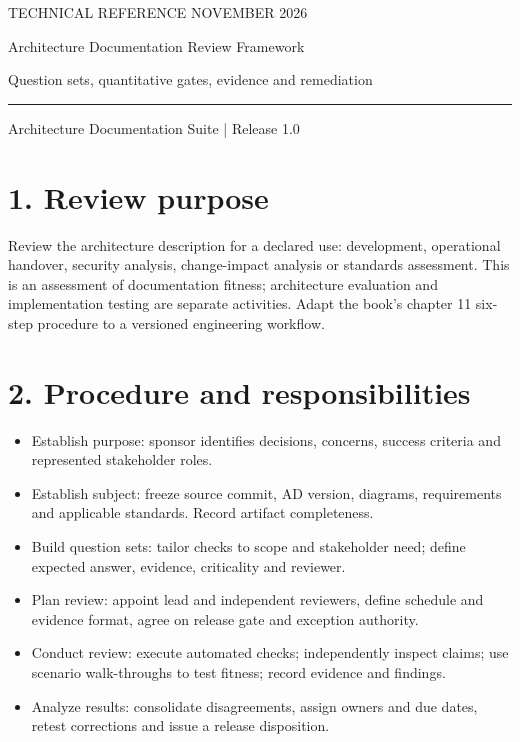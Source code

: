 \documentclass[11pt,letterpaper]{article}
\begin{document}
\thispagestyle{empty}
{\color{accent}\large TECHNICAL REFERENCE \hfill NOVEMBER 2026}\par\vspace{1.1cm}
{\color{ink}\LARGE\bfseries\raggedright Architecture Documentation Review Framework}\par\vspace{0.35cm}
{\Large Question sets, quantitative gates, evidence and remediation}\par\vspace{0.55cm}
\rule{\textwidth}{0.7pt}\par\smallskip
{\small Architecture Documentation Suite | Release 1.0}\par\vspace{0.7cm}
\tableofcontents
\newpage
\section*{1. Review purpose}
Review the architecture description for a declared use: development, operational handover, security analysis, change-impact analysis or standards assessment. This is an assessment of documentation fitness; architecture evaluation and implementation testing are separate activities. Adapt the book's chapter 11 six-step procedure to a versioned engineering workflow.\par\smallskip
\section*{2. Procedure and responsibilities}
\begin{itemize}
\item Establish purpose: sponsor identifies decisions, concerns, success criteria and represented stakeholder roles.
\item Establish subject: freeze source commit, AD version, diagrams, requirements and applicable standards. Record artifact completeness.
\item Build question sets: tailor checks to scope and stakeholder need; define expected answer, evidence, criticality and reviewer.
\item Plan review: appoint lead and independent reviewers, define schedule and evidence format, agree on release gate and exception authority.
\item Conduct review: execute automated checks; independently inspect claims; use scenario walk-throughs to test fitness; record evidence and findings.
\item Analyze results: consolidate disagreements, assign owners and due dates, retest corrections and issue a release disposition.
\end{itemize}
\end{document}
